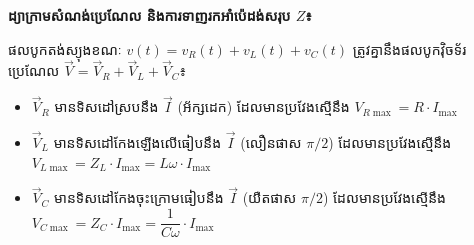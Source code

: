 \vspace{0.2em}

\vspace{0.6em}
\noindent
\textbf{ដ្យាក្រាមសំណង់ប្រេណែល និងការទាញរកអាំប៉េដង់សរុប $Z$៖}

\noindent
ផលបូកតង់ស្យុងខណៈ $v(t) = v_R(t) + v_L(t) + v_C(t)$ ត្រូវគ្នានឹងផលបូកវ៉ិចទ័រប្រេណែល $\vec{V} = \vec{V}_R + \vec{V}_L + \vec{V}_C$៖
\begin{itemize}[itemsep=2pt, topsep=1pt, leftmargin=1.6em]
	\item $\vec{V}_R$ មានទិសដៅស្របនឹង $\vec{I}$ (អ័ក្សដេក) ដែលមានប្រវែងស្មើនឹង $V_{R\max} = R \cdot I_{\max}$
	\item $\vec{V}_L$ មានទិសដៅកែងឡើងលើធៀបនឹង $\vec{I}$ (លឿនផាស $\pi/2$) ដែលមានប្រវែងស្មើនឹង $V_{L\max} = Z_L \cdot I_{\max} = L\omega \cdot I_{\max}$
	\item $\vec{V}_C$ មានទិសដៅកែងចុះក្រោមធៀបនឹង $\vec{I}$ (យឺតផាស $\pi/2$) ដែលមានប្រវែងស្មើនឹង $V_{C\max} = Z_C \cdot I_{\max} = \dfrac{1}{C\omega} \cdot I_{\max}$
\end{itemize}

